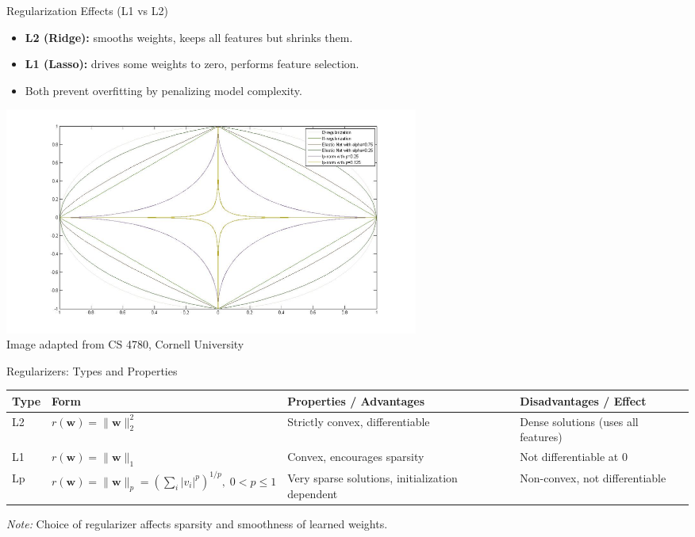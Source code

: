 \documentclass[serif, aspectratio=169]{beamer}
\begin{document}
\begin{frame}{Regularization Effects (L1 vs L2)}
    \begin{itemize}
        \item \textbf{L2 (Ridge):} smooths weights, keeps all features but shrinks them.
        \item \textbf{L1 (Lasso):} drives some weights to zero, performs feature selection.
        \item Both prevent overfitting by penalizing model complexity.
    \end{itemize}
    \centering
    \includegraphics[width=0.6\textwidth]{pic/regularizers.jpg}
    \vspace{0.3em}
    \\
    {\scriptsize Image adapted from CS 4780, Cornell University}
\end{frame}
\begin{frame}{Regularizers: Types and Properties}
    \centering
    \small
    \renewcommand{\arraystretch}{2} %
    \begin{tabular}{|p{1cm}|p{3.2cm}|p{4.5cm}|p{4cm}|}
        \hline
        \textbf{Type} & \textbf{Form} & \textbf{Properties / Advantages} & \textbf{Disadvantages / Effect} \\ \hline
        L2 & $r(\mathbf{w}) = \|\mathbf{w}\|_2^2$ 
        & Strictly convex, differentiable 
        & Dense solutions (uses all features) \\ \hline
        L1 & $r(\mathbf{w}) = \|\mathbf{w}\|_1$ 
        & Convex, encourages sparsity 
        & Not differentiable at 0 \\ \hline
        Lp & $r(\mathbf{w}) = \|\mathbf{w}\|_p = (\sum_i |v_i|^p)^{1/p}, \; 0<p\le 1$ 
        & Very sparse solutions, initialization dependent 
        & Non-convex, not differentiable \\ \hline
    \end{tabular}
    
    \vspace{0.8em}
    \scriptsize
    \textit{Note:} Choice of regularizer affects sparsity and smoothness of learned weights.
\end{frame}
\end{document}
